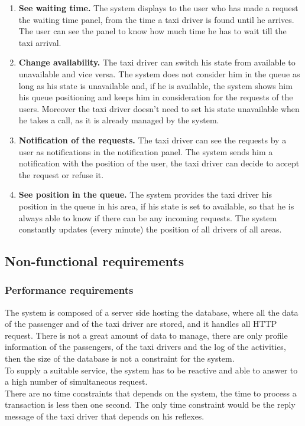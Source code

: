 \documentclass[18pt,oneside,a4paper, titlepage]{article}
\begin{document}
\begin{enumerate}
			\item \textbf{See waiting time.}
				The system displays to the user who has made a request the waiting time panel, from the time a taxi driver is found until he arrives. The user can see the panel to know how much time he has to wait till the taxi arrival.
				
			\item \textbf{Change availability.}
				The taxi driver can switch his state from available to unavailable and vice versa. The system does not consider him in the queue as long as his state is unavailable and, if he is available, the system shows him his queue positioning and keeps him in consideration for the requests of the users.
				Moreover the taxi driver doesn't need to set his state unavailable when he takes a call, as it is already managed by the system.
				
			\item \textbf{Notification of the requests.}
				The taxi driver can see the requests by a user as notifications in the notification panel. The system sends him a notification with the position of the user, the taxi driver can decide to accept the request or refuse it.
				
			\item \textbf{See position in the queue.}
				The system provides the taxi driver his position in the queue in his area, if his state is set to available, so that he is always able to know if there can be any incoming requests. The system constantly updates (every minute) the position of all drivers of all areas.
				
		\end{enumerate}
	\subsection{Non-functional requirements}
		\subsubsection{Performance requirements}
			The system is composed of a server side hosting the database, where all the data of the passenger and of the taxi driver are stored, and it handles all HTTP request. There is not a great amount of data to manage, there are only profile information of the passengers, of the taxi drivers and the log of the activities, then the size of the database is not a constraint for the system.\\ To supply a suitable service, the system has to be reactive and able to answer to a high number of simultaneous request.\\ There are no time constraints that depends on the system, the time to process a transaction is less then one second. The only time constraint would be the reply message of the taxi driver that depends on his reflexes.
\end{document}
